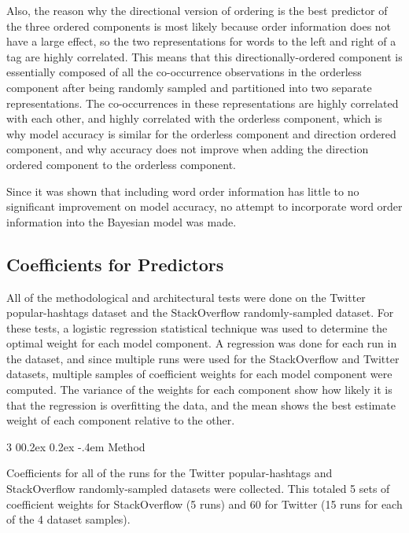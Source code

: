 \documentclass[man,floatsintext,donotrepeattitle]{apa6}
\makeatletter
\renewcommand{\subsubsection}{%
  \@startsection
  {subsubsection}%
  {3}%
  {\parindent}%
  {0\baselineskip \@plus 0.2ex \@minus 0.2ex}%
  {-.4em}%
  {\normalfont\normalsize\bfseries\addperi}}
\makeatother
\begin{document}
Also, the reason why the directional version of ordering is the best predictor of the three ordered components is most likely because order information does not have a large effect,
so the two representations for words to the left and right of a tag are highly correlated.
This means that this directionally-ordered component is essentially composed of all the co-occurrence observations in the orderless component after being randomly sampled and partitioned into two separate representations.
The co-occurrences in these representations are highly correlated with each other, and highly correlated with the orderless component,
which is why model accuracy is similar for the orderless component and direction ordered component, and why accuracy does not improve when adding the direction ordered component to the orderless component.

Since it was shown that including word order information has little to no significant improvement on model accuracy, no attempt to incorporate word order information into the Bayesian model was made.

\subsection{Coefficients for Predictors}

All of the methodological and architectural tests were done on the Twitter popular-hashtags dataset and the StackOverflow randomly-sampled dataset.
For these tests, a logistic regression statistical technique was used to determine the optimal weight for each model component.
A regression was done for each run in the dataset, and since multiple runs were used for the StackOverflow and Twitter datasets, multiple samples of coefficient weights for each model component were computed.
The variance of the weights for each component show how likely it is that the regression is overfitting the data,
and the mean shows the best estimate weight of each component relative to the other.

\subsubsection{Method}

Coefficients for all of the runs for the Twitter popular-hashtags and StackOverflow randomly-sampled datasets were collected.
This totaled 5 sets of coefficient weights for StackOverflow (5 runs) and 60 for Twitter (15 runs for each of the 4 dataset samples).
\end{document}
